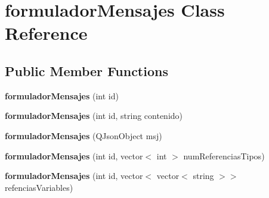 \hypertarget{classformulador_mensajes}{}\section{formulador\+Mensajes Class Reference}
\label{classformulador_mensajes}
\subsection*{Public Member Functions}
\begin{DoxyCompactItemize}
\item 
{\bfseries formulador\+Mensajes} (int id)\hypertarget{classformulador_mensajes_a6685db6ef842465df2b4442fa20d4df6}{}\label{classformulador_mensajes_a6685db6ef842465df2b4442fa20d4df6}

\item 
{\bfseries formulador\+Mensajes} (int id, string contenido)\hypertarget{classformulador_mensajes_a71b3575b472ad00b72595d07977d4f0a}{}\label{classformulador_mensajes_a71b3575b472ad00b72595d07977d4f0a}

\item 
{\bfseries formulador\+Mensajes} (Q\+Json\+Object msj)\hypertarget{classformulador_mensajes_a48917a1948603eadefc34a3d4bfb5c56}{}\label{classformulador_mensajes_a48917a1948603eadefc34a3d4bfb5c56}

\item 
{\bfseries formulador\+Mensajes} (int id, vector$<$ int $>$ num\+Referencias\+Tipos)\hypertarget{classformulador_mensajes_ac1a432c3f13ce526e55f3c6bdd5e1584}{}\label{classformulador_mensajes_ac1a432c3f13ce526e55f3c6bdd5e1584}

\item 
{\bfseries formulador\+Mensajes} (int id, vector$<$ vector$<$ string $>$$>$ refencias\+Variables)\hypertarget{classformulador_mensajes_ac14671f8ac3697a2461050deebb5b5e0}{}\label{classformulador_mensajes_ac14671f8ac3697a2461050deebb5b5e0}


\end{DoxyCompactItemize}
